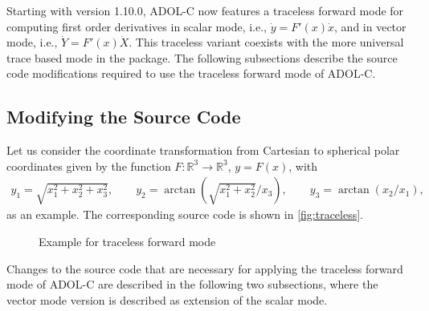 \documentclass[11pt,twoside]{article}
\begin{document}
Starting with version 1.10.0, ADOL-C now features a traceless forward
mode for computing first order derivatives in scalar mode, i.e.,
$\dot{y} = F'(x)\dot{x}$, and in vector mode, i.e., $\dot{Y} = F'(x)\dot{X}$. 
This traceless variant coexists with the more universal
trace based mode in the package. The following subsections describe
the source code modifications required to use the traceless forward mode of
ADOL-C.  
%
\subsection{Modifying the Source Code}
%
Let us consider the coordinate transformation from Cartesian to spherical
polar coordinates given by the function $F: \mathbb{R}^3 \to \mathbb{R}^3$, $y
= F(x)$, with
\begin{eqnarray*}
y_1  =  \sqrt{x_1^2 + x_2^2 + x_3^2},\qquad
y_2  =  \arctan\left(\sqrt{x_1^2 + x_2^2}/x_3\right),\qquad
y_3  =  \arctan(x_2/x_1),
\end{eqnarray*}
as an example. The corresponding source code is shown in \autoref{fig:traceless}.
\begin{figure}[htb]
\caption{Example for traceless forward mode}
\label{fig:traceless}
\end{figure}
%
Changes to the source code that are necessary for applying the
traceless forward mode of ADOL-C are described in the following two
subsections, where the vector mode version is described
as extension of the scalar mode. 
%
\end{document}
